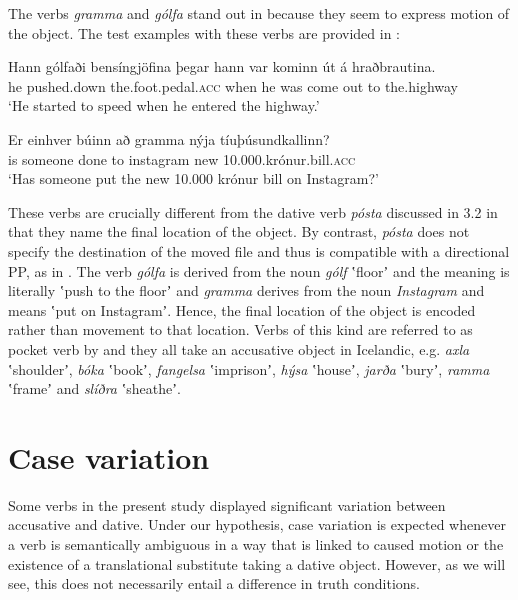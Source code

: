 \documentclass[output=paper,modfonts,nonflat,colorlinks,citecolor=brown]{langsci/langscibook}
\begin{document}
{The verbs \textit{gramma} and \textit{gólfa} stand out in  because they seem to express motion of the object. The test examples with these verbs are provided in :


 
\ea%
    \label{ex:jonsson:6}
    \ea
\gll  Hann  gólfaði  bensíngjöfina  þegar  hann  var  kominn  út  á  hraðbrautina.\\
   he  pushed.down  the.foot.pedal.\textsc{acc}  when  he  was  come  out  to  the.highway\\
   \glt `He started to speed when he entered the highway.' 

\ex
\gll   Er  einhver  búinn  að  gramma  nýja  tíuþúsundkallinn?\\
 is  someone  done  to  instagram  new  10.000.krónur.bill.\textsc{acc}\\
\glt `Has someone put the new 10.000 krónur bill on Instagram?'
\z
\z


These verbs are crucially different from the dative verb \textit{pósta}  discussed in 3.2 in that they name the final location of the object. By contrast, \textit{pósta} does not specify the destination of the moved file and thus is compatible with a directional PP, as in . The verb \textit{gólfa} is derived from the noun \textit{gólf} ʽfloorʼ and the meaning is literally ʽpush to the floorʼ and \textit{gramma} derives from the noun \textit{Instagram} and means ʽput on Instagramʼ. Hence, the final location of the object is encoded rather than movement to that location. Verbs of this kind are referred to as pocket verb by \citet{Levin1993} and they all take an accusative object in Icelandic, e.g. \textit{axla} ʽshoulderʼ, \textit{bóka} ʽbookʼ, \textit{fangelsa} ʽimprisonʼ, \textit{hýsa} ʽhouseʼ, \textit{jarða} ʽburyʼ, \textit{ramma} ʽframeʼ and \textit{slíðra} ʽsheatheʼ. 

\section{Case variation}  %

Some verbs in the present study displayed significant variation between accusative and dative. Under our hypothesis, case variation is expected whenever a verb is semantically ambiguous in a way that is linked to caused motion or the existence of a translational substitute taking a dative object. However, as we will see, this does not necessarily entail a difference in truth conditions.

}
\end{document}
